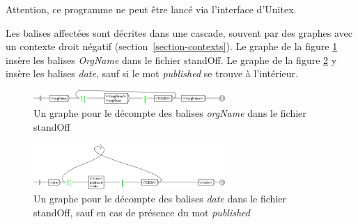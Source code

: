 \noindent Attention, ce programme ne peut être lancé via l'interface d'Unitex.


Les balises affectées sont décrites dans une cascade, souvent par des graphes avec un contexte droit négatif (section~\ref{section-contexts}). Le graphe de la figure \ref{standOffOrgName} insère les balises \emph{OrgName} dans le fichier standOff. Le graphe de la figure \ref{standOffDate} y insère les balises \emph{date}, sauf si le mot \emph{published} se trouve à l'intérieur.


\begin{figure}[!htb]
  \centering
  \includegraphics[width=7.28cm]{resources/img/grfOrgName.png}
  \caption{Un graphe pour le décompte des balises \emph{orgName} dans le fichier standOff}
  \label{standOffOrgName}
\end{figure}


\begin{figure}[!htb]
  \centering
  \includegraphics[width=7.28cm]{resources/img/grfDate.png}
  \caption{Un graphe pour le décompte des balises \emph{date} dans le fichier standOff, sauf en cas de présence du mot \emph{published}}
  \label{standOffDate}
\end{figure}
